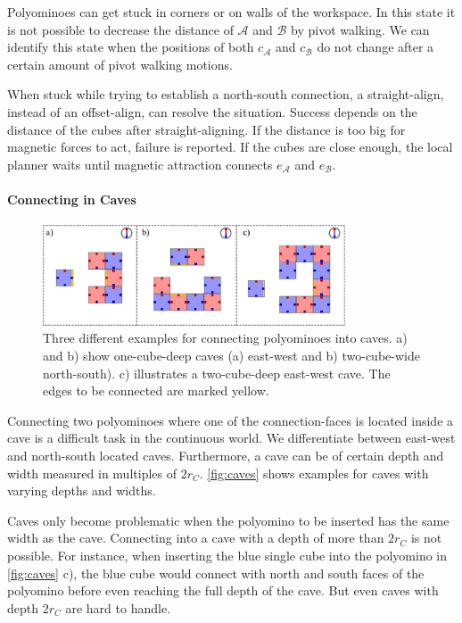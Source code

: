 Polyominoes can get stuck in corners or on walls of the workspace.
In this state it is not possible to decrease the distance of $\mathcal{A}$ and $\mathcal{B}$ by pivot walking.
We can identify this state when the positions  of both $c_\mathcal{A}$ and $c_\mathcal{B}$ do not change after a certain amount of pivot walking motions.

When stuck while trying to establish a north-south connection, a straight-align, instead of an offset-align, can resolve the situation.
Success depends on the distance of the cubes after straight-aligning.
If the distance is too big for magnetic forces to act, failure is reported.
If the cubes are close enough, the local planner waits until magnetic attraction connects $e_\mathcal{A}$ and $e_\mathcal{B}$.


\paragraph{Connecting in Caves}

\begin{figure}
	\centering
	\includegraphics[width=0.80\textwidth]{figures/caves.pdf}
	\caption[Examples for connecting polyominoes into caves]{Three different examples for connecting polyominoes into caves. a) and b) show one-cube-deep caves (a) east-west and b) two-cube-wide north-south). c) illustrates a two-cube-deep east-west cave. The edges to be connected are marked yellow.}
	\label{fig:caves}
\end{figure}

Connecting two polyominoes where one of the connection-faces is located inside a cave is a difficult task in the continuous world.
We differentiate between east-west and north-south located caves.
Furthermore, a cave can be of certain depth and width measured in multiples of $2 r_C$.
\autoref{fig:caves} shows examples for caves with varying depths and widths.

Caves only become problematic when the polyomino to be inserted has the same width as the cave.
Connecting into a cave with a depth of more than $2 r_C$ is not possible.
For instance, when inserting the blue single cube into the polyomino in \autoref{fig:caves} c), the blue cube would connect with north and south faces of the polyomino before even reaching the full depth of the cave.
But even caves with depth $2 r_C$ are hard to handle.

